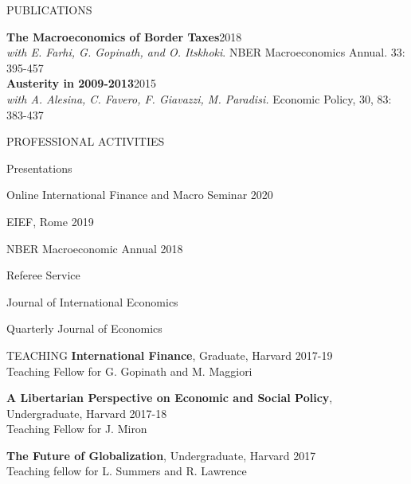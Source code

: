 \documentclass{resume} %
\begin{document}
\begin{rSection}{PUBLICATIONS}
	
	{\textbf{The Macroeconomics of Border Taxes}\hfill{2018}}\\\textit{with E. Farhi, G. Gopinath, and O. Itskhoki}. NBER Macroeconomics Annual. 33: 395-457\\

	
	\textbf{Austerity in 2009-2013}\hfill 2015\\
	\textit{with A. Alesina, C. Favero, F. Giavazzi, M. Paradisi.} Economic Policy, 30, 83: 383-437\\

	
\end{rSection} 






\begin{rSection}{PROFESSIONAL ACTIVITIES} 
\begin{rSubsection}{Presentations}{}{}{}
	\item Online International Finance and Macro Seminar \hfill 2020
	\item EIEF, Rome \hfill 2019
	\item NBER Macroeconomic Annual \hfill 2018
\end{rSubsection}

\begin{rSubsection}{Referee Service}{}{}{}
	\item Journal of International Economics
	\item Quarterly Journal of Economics
\end{rSubsection}

\end{rSection} 

\begin{rSection}{TEACHING} 
\textbf{International Finance}, Graduate, Harvard \hfill 2017-19 \\
Teaching Fellow for G. Gopinath and M. Maggiori

\textbf{A Libertarian Perspective on Economic and Social Policy}, Undergraduate, Harvard \hfill 2017-18 \\ Teaching Fellow for J. Miron

\textbf{The Future of Globalization}, Undergraduate, Harvard \hfill 2017 \\
Teaching fellow for L. Summers and R. Lawrence
\end{rSection}


\bigskip
\end{document}
